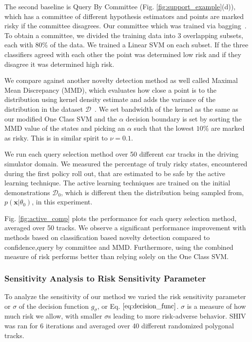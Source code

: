 \documentclass[10pt, conference]{ieeeconf}      %
\newcommand{\bx}{\mathbf{x}}
\begin{document}
The second baseline is Query By Committee (Fig. \ref{fig:support_example}(d)), which has a committee of different hypothesis estimators and points are marked risky if the committee disagrees. Our committee which was trained via bagging~\cite{breiman1996bagging}.  To obtain a committee, we divided the training data into 3 overlapping subsets, each with 80\% of the data. We trained a Linear SVM on each subset. If the three classifiers agreed with each other the point was determined low risk and if they disagree it was determined high risk. 

We compare against another novelty detection method as well called Maximal Mean Discrepancy (MMD), which evaluates how close a point is to the distribution using kernel density estimate and adds the variance of the distribution in the dataset $\mathcal{D}$~\cite{kim2013maximum}.  We set bandwidth of the kernel as the same as our modified One Class SVM and the $\alpha$ decision boundary is set by sorting the MMD value of the states and picking an $\alpha$ such that the lowest $10\%$ are marked as risky. This is in similar spirit to $\nu = 0.1$. 

We run each query selection method over 50 different car tracks in the driving simulator domain. We measured the percentage of truly risky states, encountered during the first policy roll out, that  are estimated to be safe by the active learning technique. The active learning techniques are trained on the initial demonstrations $\mathcal{D}_0$, which is different then the distribution being sampled from, $p(\bx|\theta_0)$, in this experiment.

 Fig. \ref{fig:active_comp}  plots the performance for each query selection method, averaged over 50 tracks. We observe a significant performance improvement with methods based on classification based novelty detection compared to confidence,query by committee and MMD. Furthermore, using the combined measure of risk performs better than relying solely on the One Class SVM. 

\subsubsection{Sensitivity Analysis to Risk Sensitivity Parameter}

 To analyze the sensitivity of our method we varied the risk sensitivity  parameter or $\sigma$ of the decision function $g_{\sigma}$, or Eq. $\ref{eq:decision_func}$. $\sigma$ is a measure of how much risk we allow, with smaller $\sigma$s leading to more risk-adverse behavior. SHIV was ran for 6 iterations and averaged over 40 different randomized polygonal tracks. 
\end{document}

